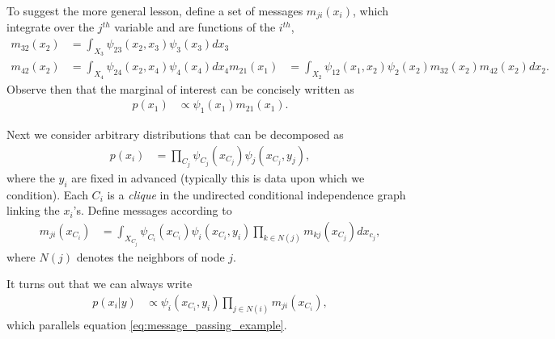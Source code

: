 \documentclass[14pt]{extreport}
\begin{document}
To suggest the more general lesson, define a set of messages
$m_{ji}\left(x_i\right)$, which integrate over the $j^{th}$ variable and are
functions of the $i^{th}$,
\begin{align*}
  m_{32}\left(x_2\right) &= \int_{X_3} \psi_{23}\left(x_2, x_3\right)\psi_3\left(x_3\right) dx_3 \\
  m_{42}\left(x_2\right) &= \int_{X_4} \psi_{24}\left(x_2, x_4\right)\psi_4\left(x_4\right) dx_4
  m_{21}\left(x_1\right) &= \int_{X_2} \psi_{12}\left(x_1, x_2\right) \psi_2\left(x_2\right) m_{32}\left(x_2\right) m_{42}\left(x_2\right) dx_2.
\end{align*}
Observe then that the marginal of interest can be concisely written as
\begin{align}
  \label{eq:message_passing_example}
  p\left(x_1\right) &\propto \psi_1\left(x_1\right) m_{21}\left(x_1\right).
\end{align}

Next we consider arbitrary distributions that can be decomposed as
\begin{align*}
  p\left(x_i\right) &= \prod_{C_j} \psi_{C_j}\left(x_{C_j}\right)\psi_{j}\left(x_{C_j}, y_{j}\right),
\end{align*}
where the $y_i$ are fixed in advanced (typically this is data upon which we
condition). Each $C_i$ is a \textit{clique} in the undirected conditional
independence graph linking the $x_i$'s. Define messages according to
\begin{align*}
  m_{ji}\left(x_{C_i}\right) &= \int_{X_{C_{j}}} \psi_{C_i}\left(x_{C_{i}}\right) \psi_{i}\left(x_{C_{i}}, y_{i}\right) \prod_{k \in N\left(j\right)} m_{kj}\left(x_{C_{j}}\right) dx_{c_{j}},
\end{align*}
where $N\left(j\right)$ denotes the neighbors of node $j$.

It turns out that we can always write
\begin{align}
  \label{eq:message_update}
  p\left(x_{i} \vert y\right) &\propto \psi_{i}\left(x_{C_i}, y_i\right) \prod_{j \in N\left(i\right)} m_{ji}\left(x_{C_i}\right),
\end{align}
which parallels equation \ref{eq:message_passing_example}.
\end{document}
